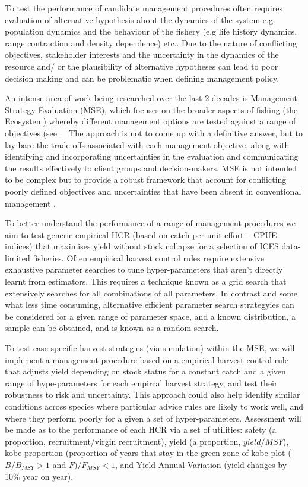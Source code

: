 \documentclass[preprint,12pt]{elsarticle}
\begin{document}
To test the performance of candidate management procedures often requires evaluation of alternative hypothesis about the dynamics of the system e.g. population dynamics and the behaviour of the fishery (e.g life history dynamics, range contraction and density dependence) etc.. Due to the nature of conflicting objectives, stakeholder interests and the uncertainty in the dynamics of the resource and/ or the plausibility of alternative hypotheses can lead to poor decision making and can be problematic when defining management policy.

An intense area of work being researched over the last 2 decades is Management Strategy Evaluation (MSE), which focuses on the broader aspects of fishing (the Ecosystem) whereby different management options are tested against a range of objectives (see \cite{Kell et al., 2007}.  The approach is not to come up with a definitive answer, but to lay-bare the trade offs associated with each management objective, along with identifying and incorporating uncertainties in the evaluation and communicating the results effectively to client groups and decision-makers. MSE is not intended to be complex but to provide a robust framework that account for conflicting poorly defined objectives and uncertainties that have been absent in conventional management \cite{Kell et al., 2007}.  

To better understand the performance of a range of management procedures we aim to test generic empirical HCR (based on catch per unit effort – CPUE indices) that maximises yield without stock collapse for  a selection of ICES data-limited fisheries. Often empirical harvest control rules require extensive exhaustive parameter searches to tune hyper-parameters that aren’t directly learnt from estimators.  This requires a technique known as a grid search that extensively searches for all combinations of all parameters. In contrast and some what less time consuming, alternative efficient parameter search strategyies can be considered for a given range of parameter space, and a known distribution, a sample can be obtained, and is known as a random search.  

To test case specific harvest strategies (via simulation) within the MSE, we will implement a management procedure based on a empirical harvest control rule that adjusts yield depending on stock status for a constant catch and a given range of hype-parameters for each empircal harvest strategy, and test their robustness to risk and uncertainty.  This approach could also help identify similar conditions across species where particular advice rules are likely to work well, and where they perform poorly for a given a set of hyper-parameters. Assessment will be made as to the performance of each HCR via a set of utilities: safety (a proportion, recruitment/virgin recruitment), yield (a proportion, $yield/MSY$), kobe proportion (proportion of years that stay in the green zone of kobe plot ($B/B_{MSY} >1$ and $F)/F_{MSY} < 1$, and Yield Annual Variation (yield changes by 10\% year on year). 
\end{document}
